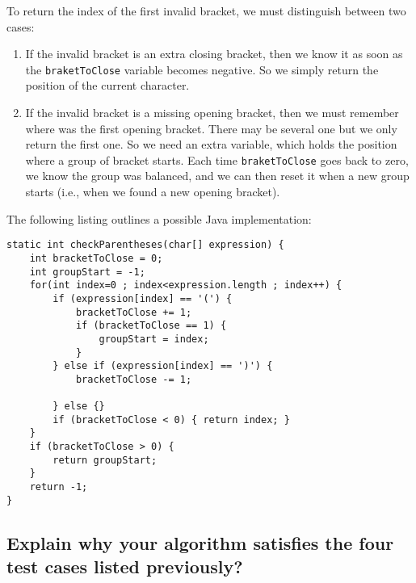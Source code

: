 \documentclass[11pt]{article}
\begin{document}
To return the index of the first invalid bracket, we must
distinguish between two cases:

\begin{enumerate}
\item If the invalid bracket is an extra closing bracket, then we
know it as soon as the \texttt{braketToClose} variable becomes
negative. So we simply return the position of the current
character.

\item If the invalid bracket is a missing opening bracket, then we
must remember where was the first opening bracket. There may
be several one but we only return the first one. So we need an
extra variable, which holds the position where a group of
bracket starts. Each time \texttt{braketToClose} goes back to zero,
we know the group was balanced, and we can then reset it when
a new group starts (i.e., when we found a new opening
bracket).
\end{enumerate}

The following listing outlines a possible Java implementation:

\begin{verbatim}
static int checkParentheses(char[] expression) {
    int bracketToClose = 0;
    int groupStart = -1;
    for(int index=0 ; index<expression.length ; index++) {
        if (expression[index] == '(') {
            bracketToClose += 1;
            if (bracketToClose == 1) {
                groupStart = index;
            }
        } else if (expression[index] == ')') {
            bracketToClose -= 1;

        } else {}
        if (bracketToClose < 0) { return index; }
    }
    if (bracketToClose > 0) {
        return groupStart;
    }
    return -1;
}
\end{verbatim}

\subsection{Explain why your algorithm satisfies the four test cases listed previously?}
\label{sec:org8292ca2}
\end{document}
